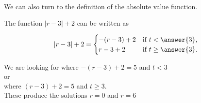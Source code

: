\documentclass{ximera}
\begin{document}
\begin{example}
\begin{image}
\end{image}



We can also turn to the definition of the absolute value function.


The function $|r-3| + 2$ can be written as 



\[
|r-3| + 2 = 
\begin{cases}
  -(r-3) + 2  & \text{if $t<\answer{3}$,}\\
   r-3 + 2  & \text{if $t\ge \answer{3}$}.
\end{cases}
\]


We are looking for where $-(r-3) + 2 = 5$ and $ t < 3$  \\

or \\

where $(r-3) + 2 = 5$ and $t \ge 3$.  \\


These produce the solutions $r=0$ and $r=6$










\end{example}
\end{document}
